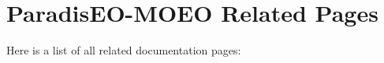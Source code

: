 \section{Paradis\-EO-MOEO Related Pages}
Here is a list of all related documentation pages:\begin{CompactList}
\item {}

\end{CompactList}
